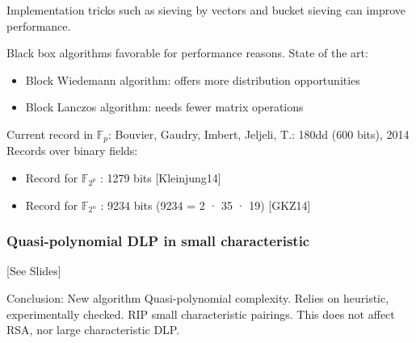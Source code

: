 \documentclass[11pt]{article}
\begin{document}
Implementation tricks such as sieving by vectors and bucket sieving can improve performance.

Black box algorithms favorable for performance reasons. State of the art:
\begin{itemize}
	\item Block Wiedemann algorithm: offers more distribution opportunities
	\item Block Lanczos algorithm: needs fewer matrix operations
\end{itemize}

Current record in $\mathbb{F}_p$: Bouvier, Gaudry, Imbert, Jeljeli, T.: 180dd (600 bits), 2014\newline
Records over binary fields: \begin{itemize}
	\item Record for $\mathbb{F}_{2^p}$ : 1279 bits [Kleinjung14]
	\item Record for $\mathbb{F}_{2^n}$ : 9234 bits (9234 = 2 · 35 · 19) [GKZ14]
\end{itemize}

\subsubsection{Quasi-polynomial DLP in small characteristic} [See Slides]

Conclusion: New algorithm Quasi-polynomial complexity. Relies on heuristic, experimentally checked. RIP small characteristic pairings. This does not affect RSA, nor large characteristic DLP.
\end{document}
